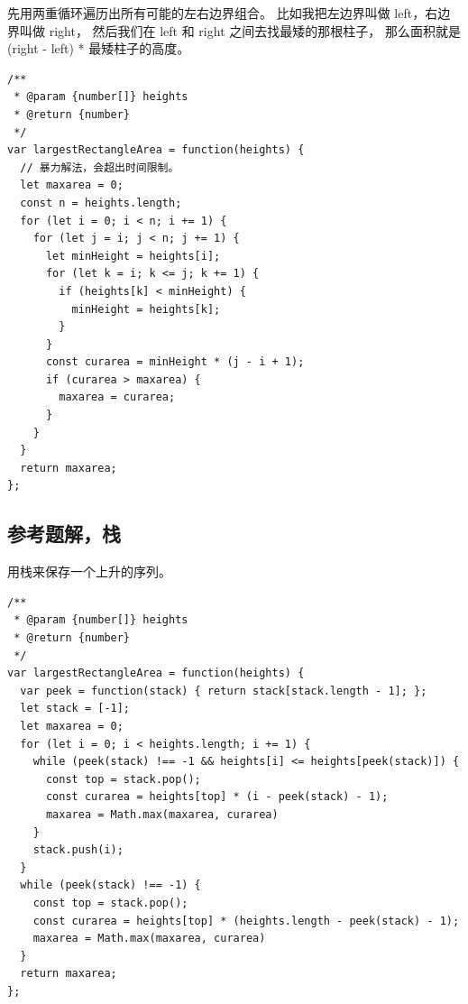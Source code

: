 先用两重循环遍历出所有可能的左右边界组合。
比如我把左边界叫做 left，右边界叫做 right，
然后我们在 left 和 right 之间去找最矮的那根柱子，
那么面积就是 (right - left) * 最矮柱子的高度。

\begin{verbatim}
/**
 * @param {number[]} heights
 * @return {number}
 */
var largestRectangleArea = function(heights) {
  // 暴力解法，会超出时间限制。
  let maxarea = 0;
  const n = heights.length;
  for (let i = 0; i < n; i += 1) {
    for (let j = i; j < n; j += 1) {
      let minHeight = heights[i];
      for (let k = i; k <= j; k += 1) {
        if (heights[k] < minHeight) {
          minHeight = heights[k];
        }
      }
      const curarea = minHeight * (j - i + 1);
      if (curarea > maxarea) {
        maxarea = curarea;
      }
    }
  }
  return maxarea;
};
\end{verbatim}

\subsection{参考题解，栈}

用栈来保存一个上升的序列。

\begin{verbatim}
/**
 * @param {number[]} heights
 * @return {number}
 */
var largestRectangleArea = function(heights) {
  var peek = function(stack) { return stack[stack.length - 1]; };
  let stack = [-1];
  let maxarea = 0;
  for (let i = 0; i < heights.length; i += 1) {
    while (peek(stack) !== -1 && heights[i] <= heights[peek(stack)]) {
      const top = stack.pop();
      const curarea = heights[top] * (i - peek(stack) - 1);
      maxarea = Math.max(maxarea, curarea)
    }
    stack.push(i);
  }
  while (peek(stack) !== -1) {
    const top = stack.pop();
    const curarea = heights[top] * (heights.length - peek(stack) - 1);
    maxarea = Math.max(maxarea, curarea)
  }
  return maxarea;
};
\end{verbatim}
